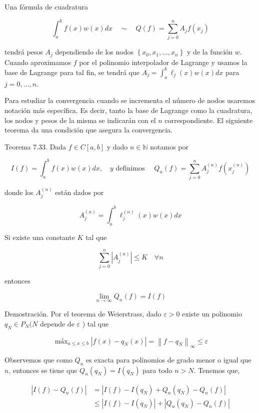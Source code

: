 \documentclass[10pt]{article}
\begin{document}
Una fórmula de cuadratura

$$
\int_{a}^{b} f(x) w(x) d x \quad \sim \quad Q(f)=\sum_{j=0}^{n} A_{j} f\left(x_{j}\right)
$$

tendrá pesos $A_{j}$ dependiendo de los nodos $\left\{x_{0}, x_{1}, \ldots, x_{n}\right\}$ y de la función $w$.\\
Cuando aproximamos $f$ por el polinomio interpolador de Lagrange y usamos la base de Lagrange para tal fin, se tendrá que $A_{j}=\int_{a}^{b} \ell_{j}(x) w(x) d x$ para $j=0, \ldots, n$.

Para estudiar la convergencia cuando se incrementa el número de nodos usaremos notación más específica. Es decir, tanto la base de Lagrange como la cuadratura, los nodos y pesos de la misma se indicarán con el $n$ correspondiente. El siguiente teorema da una condición que asegura la convergencia.

Teorema 7.33. Dada $f \in C[a, b]$ y dado $n \in \mathbb{N}$ notamos por

$$
I(f)=\int_{a}^{b} f(x) w(x) d x, \quad y \text { definimos } \quad Q_{n}(f)=\sum_{j=0}^{n} A_{j}^{(n)} f\left(x_{j}^{(n)}\right)
$$

donde los $A_{j}^{(n)}$ están dados por

$$
A_{j}^{(n)}=\int_{a}^{b} \ell_{j}^{(n)}(x) w(x) d x
$$

Si existe una constante $K$ tal que

$$
\sum_{j=0}^{n}\left|A_{j}^{(n)}\right| \leq K \quad \forall n
$$

entonces

$$
\lim _{n \rightarrow \infty} Q_{n}(f)=I(f)
$$

Demostración. Por el teorema de Weierstrass, dado $\varepsilon>0$ existe un polinomio $q_{N} \in P_{N}(N$ depende de $\varepsilon$ ) tal que

$$
\operatorname{máx}_{a \leq x \leq b}\left|f(x)-q_{N}(x)\right|=\left\|f-q_{N}\right\|_{\infty} \leq \varepsilon
$$

Observemos que como $Q_{n}$ es exacta para polinomios de grado menor o igual que $n$, entonces se tiene que $Q_{n}\left(q_{N}\right)=I\left(q_{N}\right)$ para todo $n>N$. Tenemos que,

$$
\begin{aligned}
\left|I(f)-Q_{n}(f)\right| & =\left|I(f)-I\left(q_{N}\right)+Q_{n}\left(q_{N}\right)-Q_{n}(f)\right| \\
& \leq\left|I(f)-I\left(q_{N}\right)\right|+\left|Q_{n}\left(q_{N}\right)-Q_{n}(f)\right|
\end{aligned}
$$
\end{document}
